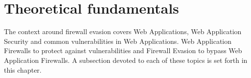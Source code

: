 \section{Theoretical fundamentals}
The context around firewall evasion covers Web Applications, Web Application Security and common vulnerabilities in Web Applications. Web Application Firewalls to protect against vulnerabilities and Firewall Evasion to bypass Web Application Firewalls.
A subsection devoted to each of these topics is set forth in this chapter.
